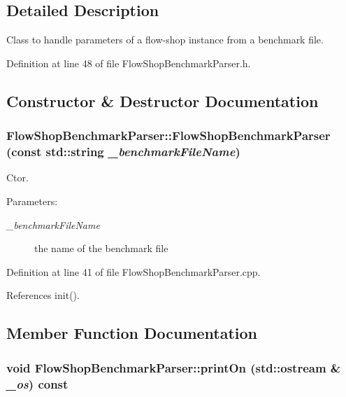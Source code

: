\subsection{Detailed Description}
Class to handle parameters of a flow-shop instance from a benchmark file. 



Definition at line 48 of file Flow\-Shop\-Benchmark\-Parser.h.

\subsection{Constructor \& Destructor Documentation}
\subsubsection{\setlength{\rightskip}{0pt plus 5cm}Flow\-Shop\-Benchmark\-Parser::Flow\-Shop\-Benchmark\-Parser (const std::string {\em \_\-benchmark\-File\-Name})}\label{classFlowShopBenchmarkParser_2787b88a1be9d4d37438c557bf32f137}


Ctor. 

\begin{Desc}
\item[Parameters:]
\begin{description}
\item[{\em \_\-benchmark\-File\-Name}]the name of the benchmark file \end{description}
\end{Desc}


Definition at line 41 of file Flow\-Shop\-Benchmark\-Parser.cpp.

References init().

\subsection{Member Function Documentation}
\subsubsection{\setlength{\rightskip}{0pt plus 5cm}void Flow\-Shop\-Benchmark\-Parser::print\-On (std::ostream \& {\em \_\-os}) const}\label{classFlowShopBenchmarkParser_69c9ba47e774da4b06424a724573265d}


